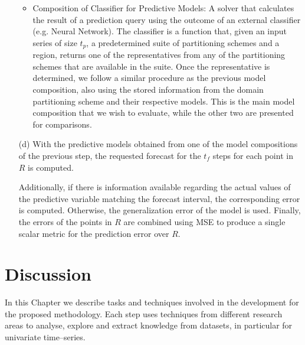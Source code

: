 \begin{itemize}
\begin{itemize}
	\item Composition of Classifier for Predictive Models: A solver that calculates the result of a prediction query using the outcome of an external classifier (e.g. Neural Network). The classifier is a function that, given an input series of size $t_p$, a predetermined suite of partitioning schemes and a region, returns one of the representatives from any of the partitioning schemes that are available in the suite. Once the representative is determined, we follow a similar procedure as the previous model composition, also using the stored information from the domain partitioning scheme and their respective models. This is the main model composition that we wish to evaluate, while the other two are presented for comparisons.
    \end{itemize}
    \item [(d)] With the predictive models obtained from one of the model compositions of the previous step, the requested forecast for the $t_{f}$ steps for each point in $R$ is computed. 
    
    Additionally, if there is information available regarding the actual values of the predictive variable matching the forecast interval, the corresponding error is computed. Otherwise, the generalization error of the model is used. Finally, the errors of the points in $R$ are combined using MSE to produce a single scalar metric for the prediction error over $R$.
\end{itemize}

\section{Discussion}
\label{Sec:MethodologyDiscussion}
In this Chapter we describe tasks and techniques involved in the development for the proposed methodology. Each step uses techniques from different research areas to analyse, explore and extract knowledge from datasets, in particular for univariate time--series.

